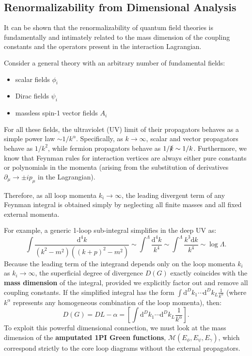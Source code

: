 \subsection{Renormalizability from Dimensional Analysis}

It can be shown that the renormalizability of quantum field theories is fundamentally and intimately related to the mass dimension of the coupling constants and the operators present in the interaction Lagrangian.

Consider a general theory with an arbitrary number of fundamental fields:
\begin{itemize}
    \item scalar fields $\phi_i$
    \item Dirac fields $\psi_i$
    \item massless spin-1 vector fields $A_i$
\end{itemize}

For all these fields, the ultraviolet (UV) limit of their propagators behaves as a simple power law $\sim 1/k^\alpha$. Specifically, as $k \to \infty$, scalar and vector propagators behave as $1/k^2$, while fermion propagators behave as $1/\slashed{k} \sim 1/k$.
Furthermore, we know that Feynman rules for interaction vertices are always either pure constants or polynomials in the momenta (arising from the substitution of derivatives $\partial_\mu \to \pm i p_\mu$ in the Lagrangian).

Therefore, as all loop momenta $k_i \to \infty$, the leading divergent term of any Feynman integral is obtained simply by neglecting all finite masses and all fixed external momenta.

For example, a generic 1-loop sub-integral simplifies in the deep UV as:
\[
    \int \frac{\mathrm{d}^4 k}{(k^2 - m^2)((k+p)^2 - m^2)} \sim \int^\Lambda \frac{\mathrm{d}^4 k}{k^4} \sim \int^\Lambda \frac{k^3 \mathrm{d}k}{k^4} \sim \log \Lambda.
\]
Because the leading term of the integrand depends only on the loop momenta $k_i$ as $k_i \to \infty$, the superficial degree of divergence $D(G)$ exactly coincides with the \textbf{mass dimension} of the integral, provided we explicitly factor out and remove all coupling constants. If the simplified integral has the form $\int \mathrm{d}^D k_1 \cdots \mathrm{d}^D k_L \frac{1}{k^\alpha}$ (where $k^\alpha$ represents any homogeneous combination of the loop momenta), then:
\[
    D(G) = D L - \alpha = \left[ \int \mathrm{d}^D k_1 \cdots \mathrm{d}^D k_L \frac{1}{k^\alpha} \right].
\]
To exploit this powerful dimensional connection, we must look at the mass dimension of the \textbf{amputated 1PI Green functions}, $\mathcal{M}(E_\phi, E_\psi, E_\gamma)$, which correspond strictly to the core loop diagrams without the external propagators.

